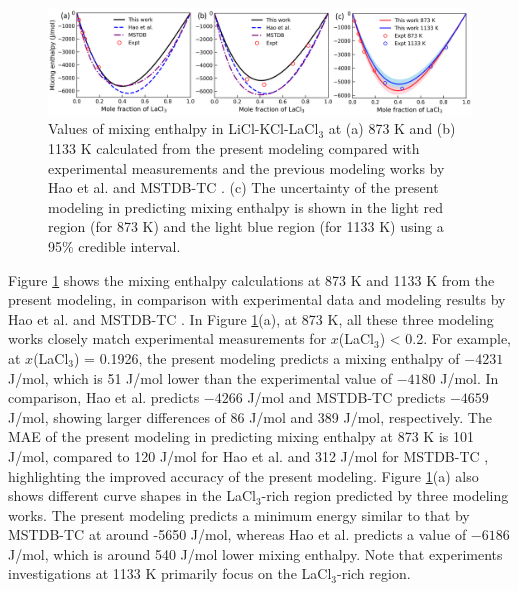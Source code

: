 \begin{figure} [H]
    \centering
    \includegraphics[width=1\linewidth]{moltensalts/Moltensalts-LaCl3-HMR-Ternary-UQ-models.png}
    \caption{Values of mixing enthalpy in LiCl-KCl-LaCl$_3$ at (a) 873 K and (b) 1133 K calculated from the present modeling compared with experimental measurements and the previous modeling works by Hao et al. \cite{hao2024thermodynamic} and MSTDB-TC \cite{ard2022development}. (c) The uncertainty of the present modeling in predicting mixing enthalpy is shown in the light red region (for 873 K) and the light blue region (for 1133 K) using a 95\% credible interval.}
    \label{ms:fig:lacl3ternaryHMRUQ}
\end{figure}


Figure \ref{ms:fig:lacl3ternaryHMRUQ} shows the mixing enthalpy calculations at 873 K and 1133 K from the present modeling, in comparison with experimental data \cite{Goncharov2024} and modeling results by Hao et al. \cite{hao2024thermodynamic} and MSTDB-TC \cite{ard2022development}. In Figure \ref{ms:fig:lacl3ternaryHMRUQ}(a), at 873 K, all these three modeling works closely match experimental measurements for $x$(LaCl$_3$) < 0.2. For example, at $x$(LaCl$_3$) = 0.1926, the present modeling predicts a mixing enthalpy of $-4231$ J/mol, which is 51 J/mol lower than the experimental value of $-4180$ J/mol. In comparison, Hao et al. \cite{hao2024thermodynamic} predicts $-4266$ J/mol and MSTDB-TC \cite{ard2022development} predicts $-4659$ J/mol, showing larger differences of 86 J/mol and 389 J/mol, respectively. The MAE of the present modeling in predicting mixing enthalpy at 873 K is 101 J/mol, compared to 120 J/mol for Hao et al. \cite{hao2024thermodynamic} and 312 J/mol for MSTDB-TC \cite{ard2022development}, highlighting the improved accuracy of the present modeling. Figure \ref{ms:fig:lacl3ternaryHMRUQ}(a) also shows different curve shapes in the LaCl$_3$-rich region predicted by three modeling works. The present modeling predicts a minimum energy similar to that by MSTDB-TC \cite{ard2022development} at around -5650 J/mol, whereas Hao et al. \cite{hao2024thermodynamic} predicts a value of $-6186$ J/mol, which is around 540 J/mol lower mixing enthalpy. Note that experiments investigations at 1133 K primarily focus on the LaCl$_3$-rich region.

